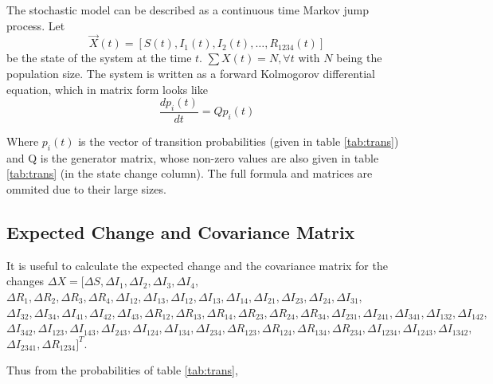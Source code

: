 \documentclass[12pt]{article}
\begin{document}
The stochastic model can be described as a continuous time Markov jump process. 
Let
$$\overrightarrow{X}(t) = [S(t), I_1(t), I_2(t), \ldots, R_{1234}(t)]$$ 
be the 
state of the system at the time $t$. $\sum X(t) = N, \forall t$ with $N$ being 
the population size. 
The system is written as a forward Kolmogorov differential equation, which in 
matrix form looks like
\begin{equation}
\frac{dp_i(t)}{dt} = Q p_i(t) 
\end{equation}

Where $p_i(t)$ is  the vector of transition probabilities (given in table 
\ref{tab:trans}) and Q is the generator matrix, whose non-zero values are also 
given in table \ref{tab:trans} (in the state change column). The full formula 
and matrices are ommited due to their large sizes.

\subsection*{Expected Change and Covariance Matrix}

It is useful to calculate the expected change and the covariance matrix for the 
changes $\Delta X = [\Delta S, \Delta I_1, \Delta I_2, \Delta I_3, \Delta I_4,$
$\Delta R_1, \Delta R_2, \Delta R_3, \Delta R_4,\Delta I_{12}, \Delta I_{13},
\Delta I_{12}, \Delta I_{13}, 
\Delta I_{14}, \Delta I_{21}, \Delta I_{23}, \Delta I_{24}, \Delta I_{31},$
$\Delta I_{32}, 
\Delta I_{34}, \Delta I_{41}, \Delta I_{42}, \Delta I_{43}, \Delta R_{12}, 
\Delta R_{13}, \Delta R_{14}, \Delta R_{23}, \Delta R_{24}, \Delta R_{34},
\Delta I_{231}, \Delta I_{241}, \Delta I_{341}, \Delta I_{132}, \Delta I_{142},$
$\Delta I_{342}, \Delta I_{123}, \Delta I_{143}, \Delta I_{243}, \Delta I_{124},
\Delta I_{134}, \Delta I_{234}, \Delta R_{123}, \Delta R_{124}, \Delta R_{134},
\Delta R_{234}, \Delta I_{1234}, \Delta I_{1243}, \Delta I_{1342},$\\
$\Delta I_{2341},\Delta R_{1234}]^T$.


Thus from the probabilities of table \ref{tab:trans},
\end{document}
